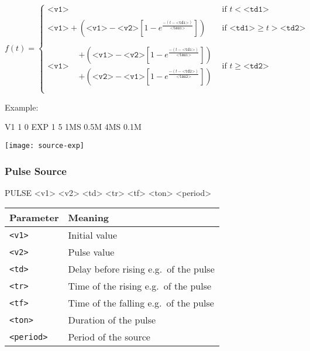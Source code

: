 \[
f(t) = \begin{cases}
\texttt{<v1>} & \text{if } t < \texttt{<td1>} \\\\
\texttt{<v1>} + \left( \texttt{<v1>} - \texttt{<v2>} \left[1-e^{\frac{-(t-\texttt{<td1>})}{\texttt{<tau1>}}}\right] \right)& \text{if } \texttt{<td1>} \ge t > \texttt{<td2>} \\\\
\texttt{<v1>} \begin{aligned}
&+ \left( \texttt{<v1>} - \texttt{<v2>} \left[1-e^{\frac{-(t-\texttt{<td1>})}{\texttt{<tau1>}}}\right] \right) \\
&+ \left( \texttt{<v2>} - \texttt{<v1>} \left[1-e^{\frac{-(t-\texttt{<td2>})}{\texttt{<tau2>}}}\right] \right)
\end{aligned}& \text{if } t \ge \texttt{<td2>} \\
\end{cases}
\]

Example:

\begin{code}
V1 1 0 EXP 1 5 1MS 0.5M 4MS 0.1M 
\end{code}

\begin{center}
	\texttt{[image: source-exp]}
\end{center}

\subsubsection{Pulse Source}

\begin{code}
PULSE <v1> <v2> <td> <tr> <tf> <ton> <period>
\end{code}

\begin{center}
	\begin{tabular}{|l|l|}
		\hline
		Parameter & Meaning \\ \hline \hline
		\texttt{<v1>} & Initial value \\ \hline
		\texttt{<v2>} & Pulse value \\ \hline
		\texttt{<td>} & Delay before rising e.g.\ of the pulse \\ \hline
		\texttt{<tr>} & Time of the rising e.g.\ of the pulse\\ \hline
		\texttt{<tf>} & Time of the falling e.g.\ of the pulse \\ \hline
		\texttt{<ton>} & Duration of the pulse \\ \hline
		\texttt{<period>} & Period of the source \\ \hline
	\end{tabular}
\end{center}

